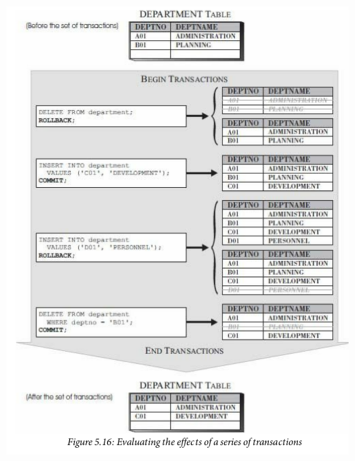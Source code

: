 \documentclass{article}
\begin{document}
\begin{figure}[h]
\centering
\includegraphics[scale=0.4]{transactions.png}
\end{figure}
\end{document}
